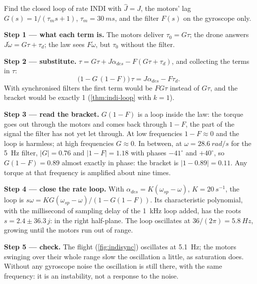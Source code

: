 \begin{example}
\label{ex:indisync-loop}
Find the closed loop of rate INDI with $\hat J = J$, the motors' lag $G(s) = 1/(\tau_m s + 1)$, $\tau_m = \SI{30}{ms}$, and the filter $F(s)$ on the gyroscope only.

\textbf{Step 1 — what each term is.} The motors deliver $\tau_0 = G\tau$; the drone answers $J\dot\omega = G\tau + \tau_d$; the law sees $F\dot\omega$, but $\tau_0$ without the filter.

\textbf{Step 2 — substitute.} $\tau = G\tau + J\alpha_{des} - F(G\tau + \tau_d)$, and collecting the terms in $\tau$:
\begin{equation*}
  \big(1 - G\,(1 - F)\big)\,\tau = J\alpha_{des} - F\tau_d .
\end{equation*}
With synchronised filters the first term would be $FG\tau$ instead of $G\tau$, and the bracket would be exactly 1 (\cref{thm:indi-loop} with $k = 1$).

\textbf{Step 3 — read the bracket.} $G(1 - F)$ is a loop inside the law: the torque goes out through the motors and comes back through $1 - F$, the part of the signal the filter has not yet let through. At low frequencies $1 - F \approx 0$ and the loop is harmless; at high frequencies $G \approx 0$. In between, at $\omega = \SI{28.6}{rad/s}$ for the \SI{5}{Hz} filter, $|G| = 0.76$ and $|1 - F| = 1.18$ with phases $-41^\circ$ and $+40^\circ$, so $G(1 - F) = 0.89$ almost exactly in phase: the bracket is $|1 - 0.89| = 0.11$. Any torque at that frequency is amplified about nine times.

\textbf{Step 4 — close the rate loop.} With $\alpha_{des} = K(\omega_{sp} - \omega)$, $K = \SI{20}{s^{-1}}$, the loop is $s\omega = K G(\omega_{sp} - \omega)/(1 - G(1 - F))$. Its characteristic polynomial, with the millisecond of sampling delay of the \SI{1}{kHz} loop added, has the roots $s = 2.4 \pm 36.3\,j$: in the right half-plane. The loop oscillates at $36/(2\pi) = \SI{5.8}{Hz}$, growing until the motors run out of range.

\textbf{Step 5 — check.} The flight (\cref{fig:indisync}) oscillates at \SI{5.1}{Hz}; the motors swinging over their whole range slow the oscillation a little, as saturation does. Without any gyroscope noise the oscillation is still there, with the same frequency: it is an instability, not a response to the noise.
\end{example}

